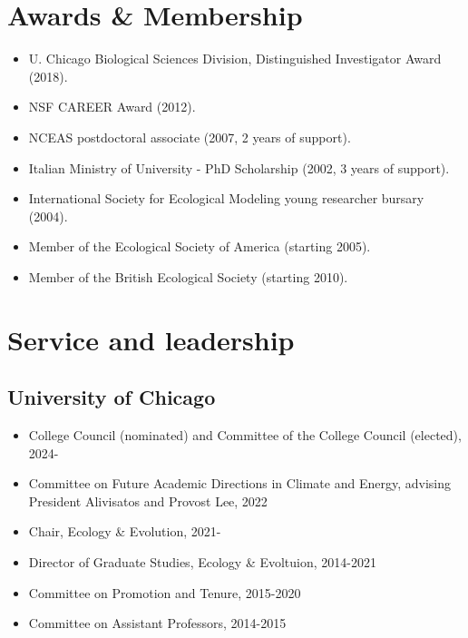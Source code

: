 \documentclass[10,letter,]{awesome-cv}
\providecommand{\tightlist}{%
	\setlength{\itemsep}{0pt}\setlength{\parskip}{0pt}}
\begin{document}
\hypertarget{awards-membership}{%
\section{Awards \& Membership}\label{awards-membership}}

\begin{itemize}
\tightlist
\item
  U. Chicago Biological Sciences Division, Distinguished Investigator
  Award (2018).
\item
  NSF CAREER Award (2012).
\item
  NCEAS postdoctoral associate (2007, 2 years of support).
\item
  Italian Ministry of University - PhD Scholarship (2002, 3 years of
  support).
\item
  International Society for Ecological Modeling young researcher bursary
  (2004).
\item
  Member of the Ecological Society of America (starting 2005).
\item
  Member of the British Ecological Society (starting 2010).
\end{itemize}

\hypertarget{service-and-leadership}{%
\section{Service and leadership}\label{service-and-leadership}}

\hypertarget{university-of-chicago}{%
\subsection{University of Chicago}\label{university-of-chicago}}

\begin{itemize}
\tightlist
\item
  College Council (nominated) and Committee of the College Council
  (elected), 2024-
\item
  Committee on Future Academic Directions in Climate and Energy,
  advising President Alivisatos and Provost Lee, 2022
\item
  Chair, Ecology \& Evolution, 2021-
\item
  Director of Graduate Studies, Ecology \& Evoltuion, 2014-2021
\item
  Committee on Promotion and Tenure, 2015-2020
\item
  Committee on Assistant Professors, 2014-2015
\end{itemize}
\end{document}
